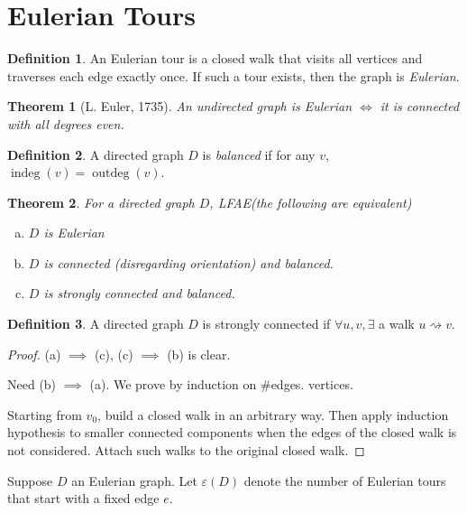 \documentclass{report}
\newtheorem{theorem}{Theorem}[section]
\theoremstyle{definition}
\newtheorem{definition}{Definition}[section]
\theoremstyle{remark}
\numberwithin{equation}{section}
\begin{document}
\section{Eulerian Tours}
\begin{definition}
    An Eulerian tour is a closed walk that visits all vertices and traverses each edge exactly once. If such a tour exists, then the graph is \emph{Eulerian}.
\end{definition}
\begin{theorem}[L. Euler, 1735] An undirected graph is Eulerian $\iff$ it is connected with all degrees even.
\end{theorem}
\begin{definition}
    A directed graph $D$ is \emph{balanced} if for any $v$, $\operatorname{indeg}(v) = \operatorname{outdeg}(v)$.
\end{definition}
\begin{theorem}
    For a directed graph $D$, LFAE(the following are equivalent)
    \begin{enumerate}[(a)]
        \item $D$ is Eulerian
        \item $D$ is connected (disregarding orientation) and balanced.
        \item $D$ is strongly connected and balanced.
    \end{enumerate}
\end{theorem}
\begin{definition}
    A directed graph $D$ is strongly connected if $\forall u, v, \exists$ a walk $u \rightsquigarrow v$.
\end{definition}
\begin{proof}
    (a) $\implies$ (c), (c) $\implies$ (b) is clear.

    Need (b) $\implies$ (a). We prove by induction on $\#$edges. vertices.

    Starting from $v_0$, build a closed walk in an arbitrary way. Then apply induction hypothesis to smaller connected components when the edges of the closed walk is not considered. Attach such walks to the original closed walk.
\end{proof}

Suppose $D$ an Eulerian graph. Let $\varepsilon(D)$ denote the number of Eulerian tours that start with a fixed edge $e$.
\end{document}
